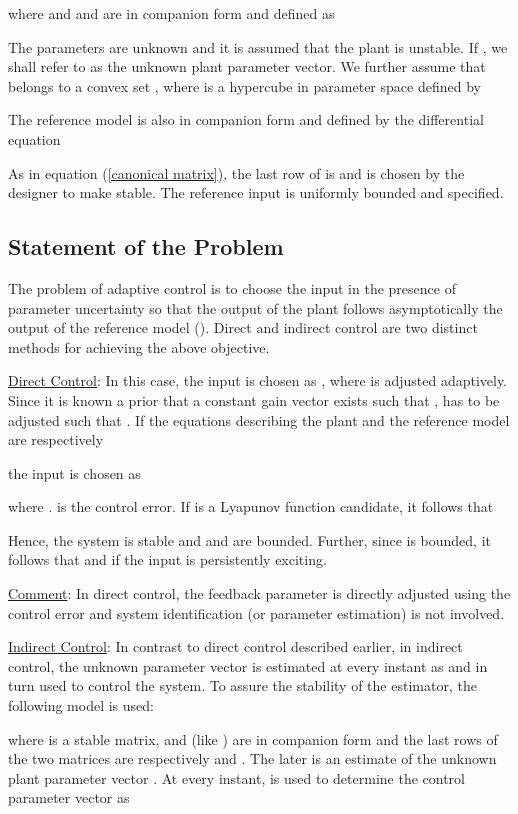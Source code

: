 \documentclass[conference]{IEEEtran}
\begin{document}
where  and  and  are in companion form and defined as


The parameters  are unknown and it is assumed that the plant is unstable. If , we shall refer to  as the unknown plant parameter vector. We further assume that  belongs to a convex set , where  is a hypercube in parameter space defined by


The reference model  is also in companion form and defined by the differential equation

As in equation (\ref{canonical matrix}), the last row of  is  and is chosen by the designer to make  stable. The reference input  is uniformly bounded and specified.

\subsection{Statement of the Problem}
The problem of adaptive control is to choose the input  in the presence of parameter uncertainty so that the output  of the plant follows asymptotically the output  of the reference model (). Direct and indirect control are two distinct methods for achieving the above objective.

{\large \underline{Direct Control}}: In this case, the input  is chosen as , where  is adjusted adaptively. Since it is known a prior that a constant gain vector  exists such that ,  has to be adjusted such that . If the equations describing the plant and the reference model are respectively

the input  is chosen as

where .  is the control error. If  is a Lyapunov function candidate, it follows that

Hence, the system is stable and  and  are bounded. Further, since  is bounded, it follows that  and  if the input  is persistently exciting.

\underline{Comment}: In direct control, the feedback parameter  is directly adjusted using the control error and system identification (or parameter estimation) is not involved.

{\large \underline{Indirect Control}}: In contrast to direct control described earlier, in indirect control, the unknown parameter vector  is estimated at every instant as  and in turn used to control the system. To assure the stability of the estimator, the following model is used:

where  is a stable matrix,  and  (like ) are in companion form and the last rows of the two matrices are respectively  and . The later is an estimate of the unknown plant parameter vector . At every instant,  is used to determine the control parameter vector  as
\end{document}
